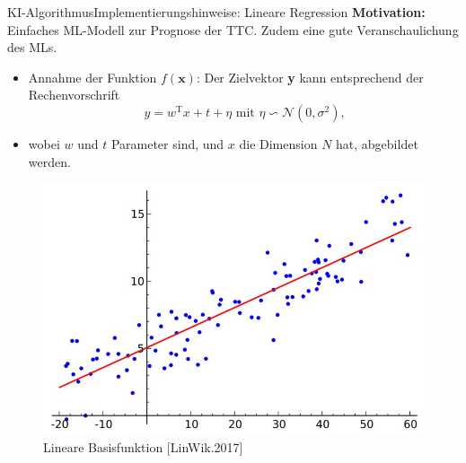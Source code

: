 \documentclass[169, handout	]{THIbeamer} %
\begin{document}
	\begin{frame}{KI-Algorithmus}{Implementierungshinweise: Lineare Regression}
		\footnotesize		
		\textbf{Motivation:} Einfaches ML-Modell zur Prognose der TTC. Zudem eine gute Veranschaulichung des MLs.
		\begin{itemize}
			\item Annahme der Funktion $f(\textbf{x})$: Der Zielvektor \textbf{y} kann entsprechend der Rechenvorschrift
			\begin{equation}
				y = w^{\text{T}} x + t + \eta \text{ mit } \eta \backsim \mathcal{N}(0, \sigma^2) \text{,}
			\end{equation}
			\item[] wobei $w$ und $t$ Parameter sind, und $x$ die Dimension $N$ hat, abgebildet werden.		   
		\end{itemize}
		\begin{figure}
			\includegraphics[scale=0.25]{required/Lineare_Regression.jpg}
			\caption{\scriptsize Lineare Basisfunktion [LinWik.2017]}
        	\label{Over and Underfitting}
		\end{figure}
	\end{frame}
\end{document}
